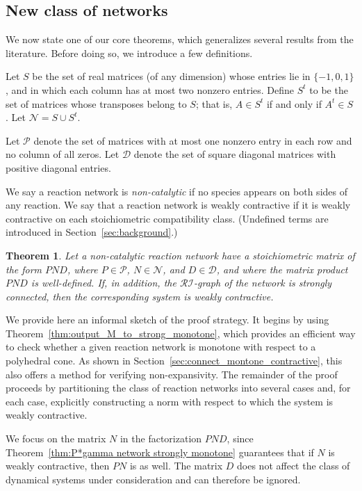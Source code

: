 \documentclass{article}
\newtheorem{fixedtheorem}{Theorem}
\begin{document}
\subsection{New class of networks} We now state one of our core theorems, which generalizes several results from the literature. Before doing so, we introduce a few definitions.

Let \( S \) be the set of real matrices (of any dimension) whose entries lie in \( \{ -1, 0, 1 \} \), and in which each column has at most two nonzero entries. Define \( S^t \) to be the set of matrices whose transposes belong to \( S \); that is, \( A \in S^t \) if and only if \( A^t \in S \). Let \( \mathcal{N} = S \cup S^t \).

Let \( \mathcal{P} \) denote the set of matrices with at most one nonzero entry in each row and no column of all zeros. Let \( \mathcal{D} \) denote the set of square diagonal matrices with positive diagonal entries.

We say a reaction network is \textit{non-catalytic} if no species appears on both sides of any reaction. We say that a reaction network is weakly contractive if it is weakly contractive on each stoichiometric compatibility class. (Undefined terms are introduced in Section~\ref{sec:background}.)

\begin{fixedtheorem}
\label{thm:collection of theorems}
Let a non-catalytic reaction network have a stoichiometric matrix of the form \( PND \), where \( P \in \mathcal{P} \), \( N \in \mathcal{N} \), and \( D \in \mathcal{D} \), and where the matrix product \( PND \) is well-defined. If, in addition, the \( \mathcal{RI} \)-graph of the network is strongly connected, then the corresponding system is weakly contractive.
\end{fixedtheorem}



We provide here an informal sketch of the proof strategy. It begins by using Theorem~\ref{thm:output_M_to_strong_monotone}, which provides an efficient way to check whether a given reaction network is monotone with respect to a polyhedral cone. As shown in Section~\ref{sec:connect_montone_contractive}, this also offers a method for verifying non-expansivity. The remainder of the proof proceeds by partitioning the class of reaction networks into several cases and, for each case, explicitly constructing a norm with respect to which the system is weakly contractive.

We focus on the matrix \(N\) in the factorization \(PND\), since Theorem~\ref{thm:P*gamma network strongly monotone} guarantees that if \(N\) is weakly contractive, then \(PN\) is as well. The matrix \(D\) does not affect the class of dynamical systems under consideration and can therefore be ignored.
\end{document}
